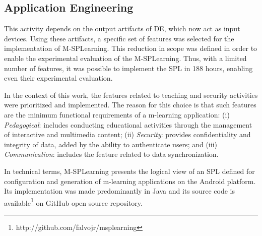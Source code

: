 \subsection{Application Engineering}\label{section32}

This activity depends on the output artifacts of DE, which now act as input devices. Using these artifacts, a specific set of features was selected for the implementation of M-SPLearning. This reduction in scope was defined in order to enable the experimental evaluation of the M-SPLearning. Thus, with a limited number of features, it was possible to implement the SPL in 188 hours, enabling even their experimental evaluation.

In the context of this work, the features related to teaching and security activities were prioritized and implemented. The reason for this choice is that such features are the minimum functional requirements of a m-learning application: (i) \textit{Pedagogical}: includes conducting educational activities through the management of interactive and multimedia content; (ii) \textit{Security}: provides confidentiality and integrity of data, added by the ability to authenticate users; and (iii) \textit{Communication}: includes the feature related to data synchronization.

In technical terms,  M-SPLearning presents the logical view of an SPL defined for configuration and generation of m-learning applications on the Android platform. Its implementation was made predominantly in Java and its source code is available\footnote{http://github.com/falvojr/msplearning} on GitHub open source repository.

